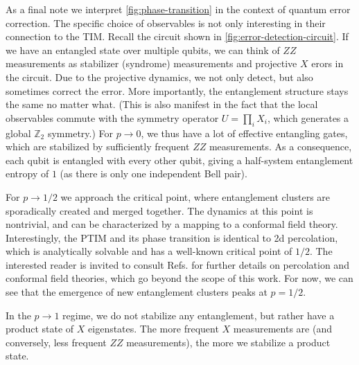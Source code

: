 As a final note we interpret \cref{fig:phase-transition} in the context of
quantum error correction. The specific choice of observables is not only
interesting in their connection to the TIM.  Recall the circuit shown in
\cref{fig:error-detection-circuit}. If we have an entangled state over multiple
qubits, we can think of $ZZ$ measurements as stabilizer (syndrome) measurements
and projective $X$ erors in the circuit. Due to the projective dynamics, we not
only detect, but also sometimes correct the error. More importantly, the
entanglement structure stays the same no matter what. (This is also manifest in
the fact that the local observables commute with the symmetry operator
$U=\prod_i X_i$, which generates a global $\mathbb{Z}_2$ symmetry.) For $p\to
0$, we thus have a lot of effective entangling gates, which are stabilized by
sufficiently frequent $ZZ$ measurements. As a consequence, each qubit is
entangled with every other qubit, giving a half-system entanglement entropy of
$1$ (as there is only one independent Bell pair).

For $p \to 1 /2$ we approach the critical point,
where entanglement clusters are sporadically created and merged together. The
dynamics at this point is nontrivial, and can be characterized by a mapping to
a conformal field theory. Interestingly, the PTIM and its phase transition is
identical to 2d percolation, which is analytically solvable and has a
well-known critical point of $1 /2$. The interested reader is invited to
consult Refs.
\cite{aharonyIntroductionPercolationTheory2017,difrancescoConformalFieldTheory1997}
for further details on percolation and conformal field theories, which go
beyond the scope of this work. For now, we can see that the emergence of new
entanglement clusters peaks at $p = 1 /2$.

In the $p\to 1$ regime, we do not stabilize any entanglement, but rather
have a product state of $X$ eigenstates. The more frequent $X$ measurements are
(and conversely, less frequent $ZZ$ measurements), the more we stabilize a
product state.



